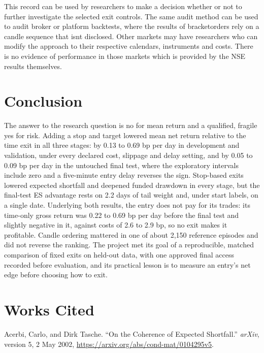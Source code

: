 \documentclass[11pt,a4paper]{article}
\begin{document}
This record can be used by researchers to make a decision whether or not to further investigate the selected exit controls. The same audit method can be used to audit broker or platform backtests, where the results of bracket\allowbreak{}orders rely on a candle sequence that isnt disclosed. Other markets may have researchers who can modify the approach to their respective calendars, instruments and costs. There is no evidence of performance in those markets which is provided by the NSE results themselves.

\section*{Conclusion}

The answer to the research question is no for mean return and a qualified, fragile yes for risk. Adding a stop and target lowered mean net return relative to the time exit in all three stages: by 0.13 to 0.69 bp per day in development and validation, under every declared cost, slippage and delay setting, and by 0.05 to 0.09 bp per day in the untouched final test, where the exploratory intervals include zero and a five-minute entry delay reverses the sign. Stop-based exits lowered expected shortfall and deepened funded drawdown in every stage, but the final-test ES advantage rests on 2.2 days of tail weight and, under start labels, on a single date. Underlying both results, the entry does not pay for its trades: its time-only gross return was 0.22 to 0.69 bp per day before the final test and slightly negative in it, against costs of 2.6 to 2.9 bp, so no exit makes it profitable. Candle ordering mattered in one of about 2,150 reference episodes and did not reverse the ranking. The project met its goal of a reproducible, matched comparison of fixed exits on held-out data, with one approved final access recorded before evaluation, and its practical lesson is to measure an entry's net edge before choosing how to exit.

\clearpage
\section*{Works Cited}

{\RaggedRight\hangindent=1.27cm\noindent Acerbi, Carlo, and Dirk Tasche. “On the Coherence of Expected Shortfall.” \textit{arXiv}, version 5, 2 May 2002, \url{https://arxiv.org/abs/cond-mat/0104295v5}.\par}\vspace{5pt}
\end{document}
